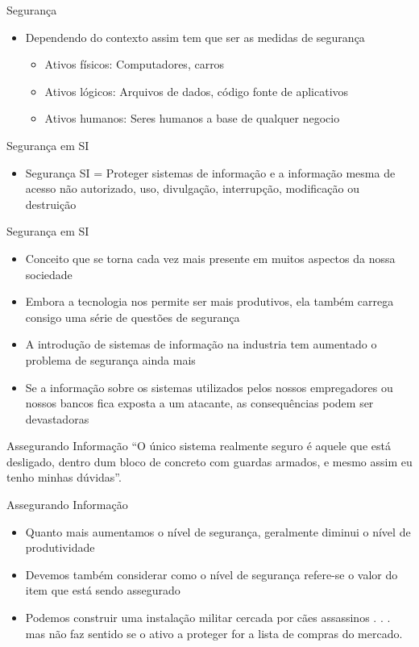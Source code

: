 \documentclass{beamer}
\begin{document}
\begin{frame}{Segurança}
\begin{itemize}
\item Dependendo do contexto assim tem que ser as medidas de segurança
\begin{itemize}
\item Ativos físicos: Computadores, carros
\item Ativos lógicos: Arquivos de dados, código fonte de aplicativos
\item Ativos humanos: Seres humanos a base de qualquer negocio
\end{itemize}
\end{itemize}
\end{frame}



\begin{frame}{Segurança em SI}
\begin{itemize}
\item Segurança SI = Proteger sistemas de informação e a informação mesma de acesso não autorizado, uso, divulgação, interrupção, modificação ou destruição
\end{itemize}
\end{frame}

\begin{frame}{Segurança em SI}
\begin{itemize}
\item Conceito que se torna cada vez mais presente em muitos aspectos da nossa sociedade
\item Embora a tecnologia nos permite ser mais produtivos, ela também carrega consigo uma série de questões de segurança
\item A introdução de sistemas de informação na industria tem aumentado o problema de segurança ainda mais
\item Se a informação sobre os sistemas utilizados pelos nossos empregadores ou nossos bancos fica exposta a um atacante, as consequências podem ser devastadoras
\end{itemize}
\end{frame}


\begin{frame}{Assegurando Informação}
``O único sistema realmente seguro é aquele que está desligado, dentro dum bloco de concreto com guardas armados, e mesmo assim eu tenho minhas dúvidas''\cite{andress2011the}.
\end{frame}

\begin{frame}{Assegurando Informação}
\begin{itemize}
\item Quanto mais aumentamos o nível de segurança, geralmente diminui o nível de produtividade
\item Devemos também considerar como o nível de segurança refere-se o valor do item que está sendo assegurado
\item Podemos construir uma instalação militar cercada por cães assassinos  . . . mas não faz sentido se o ativo a proteger for a lista de compras do mercado.
\end{itemize}
\end{frame}
\end{document}
